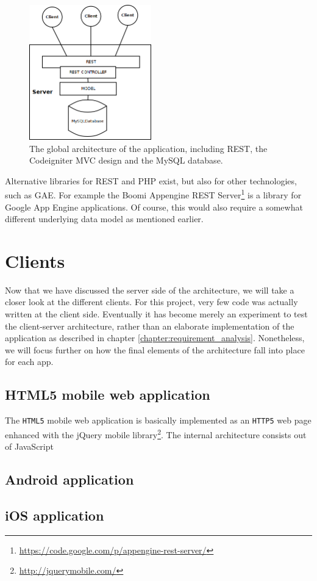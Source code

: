 \begin{figure}
	
	\begin{center}
		\includegraphics[width=200px]{img/architecture_global2}
		\caption{The global architecture of the application, including REST, the Codeigniter MVC design and the MySQL database.}
		\label{figure:architecture:global2}
	\end{center}

\end{figure}

Alternative libraries for REST and PHP exist, but also for other technologies, such as GAE. For example the Boomi Appengine REST Server\footnote{\url{https://code.google.com/p/appengine-rest-server/}} is a library for Google App Engine applications. Of course, this would also require a somewhat different underlying data model as mentioned earlier.


\section{Clients}

Now that we have discussed the server side of the architecture, we will take a closer look at the different clients. For this project, very few code was actually written at the client side. Eventually it has become merely an experiment to test the client-server architecture, rather than an elaborate implementation of the application as described in chapter \ref{chapter:requirement_analysis}. Nonetheless, we will focus further on how the final elements of the architecture fall into place for each app.


\subsection{HTML5 mobile web application}

The \texttt{HTML5} mobile web application is basically implemented as an \texttt{HTTP5} web page enhanced with the jQuery mobile library\footnote{\url{http://jquerymobile.com/}}. The internal architecture consists out of JavaScript



\subsection{Android application}


\subsection{iOS application}


